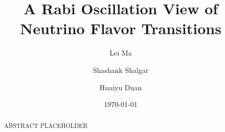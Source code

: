 \documentclass[%
preprint,
 amsmath,amssymb,
 aps,
]{revtex4-1}
\begin{document}

\title{A Rabi Oscillation View of Neutrino Flavor Transitions}%

\author{Lei Ma}
\author{Shashank Shalgar}%
\author{Huaiyu Duan}%
%








\date{\today}%

\begin{abstract}
ABSTRACT PLACEHOLDER
\end{abstract}
\end{document}
